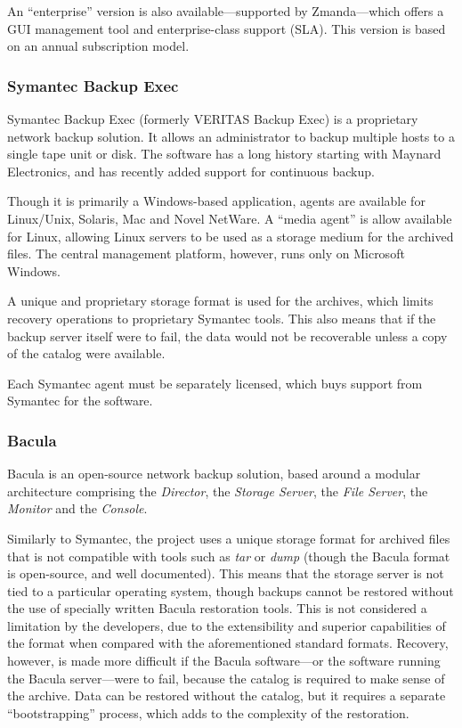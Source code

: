 \begin{bibunit}[plain]
An ``enterprise'' version is also available---supported by Zmanda---which
offers a GUI management tool and enterprise-class support (SLA).  This version
is based on an annual subscription model\cite{AMANDA-ent}.

\subsubsection{Symantec Backup Exec}

Symantec Backup Exec (formerly VERITAS Backup Exec) is a proprietary network
backup solution. It allows an administrator to backup multiple hosts to
a single tape unit or disk. The software has a long history starting with
Maynard Electronics\cite{Symantec-history}, and has recently added support for
continuous backup\cite{Symantec-about}.

Though it is primarily a Windows-based application, agents are available for
Linux/Unix, Solaris, Mac and Novel NetWare. A ``media agent'' is allow
available for Linux, allowing Linux servers to be used as a storage medium for
the archived files. The central management platform, however, runs only on
Microsoft Windows\cite{Symantec-about}.

A unique and proprietary storage format is used for the archives, which limits
recovery operations to proprietary Symantec tools. This also means that if the
backup server itself were to fail, the data would not be recoverable unless
a copy of the catalog were available.

Each Symantec agent must be separately licensed, which buys support from
Symantec for the software\cite{Symantec-about}.

\subsubsection{Bacula}

Bacula is an open-source network backup solution, based around a modular
architecture comprising the \emph{Director}, the \emph{Storage Server}, the
\emph{File Server}, the \emph{Monitor} and the
\emph{Console}\cite{Bacula-about}.

Similarly to Symantec, the project uses a unique storage format for archived
files that is not compatible with tools such as \emph{tar} or \emph{dump}
(though the Bacula format is open-source, and well documented). This means that
the storage server is not tied to a particular operating system, though backups
cannot be restored without the use of specially written Bacula restoration
tools. This is not considered a limitation by the developers, due to the
extensibility and superior capabilities of the format when compared with the
aforementioned standard formats\cite{Bacula-about}. Recovery, however, is made
more difficult if the Bacula software---or the software running the Bacula
server---were to fail, because the catalog is required to make sense of the
archive. Data can be restored without the catalog, but it requires a separate
``bootstrapping'' process, which adds to the complexity of the restoration.


\end{bibunit}
